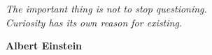 \vspace{17cm}

\begin{flushright}
\itshape{The important thing is not to stop questioning. \\ Curiosity has its own reason for existing.}

\textbf{Albert Einstein}
\end{flushright}





